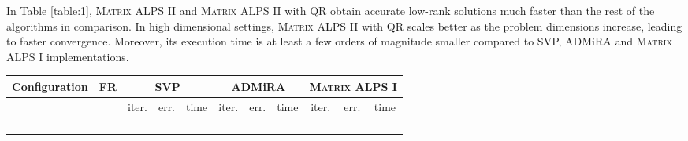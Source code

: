 \documentclass[twocolumn]{svjour3}
\begin{document}
In Table \ref{table:1}, \textsc{Matrix ALPS II} and \textsc{Matrix ALPS II} with QR obtain accurate low-rank solutions much faster than the rest of the algorithms in comparison. In high dimensional settings, \textsc{Matrix ALPS II} with QR scales better as the problem dimensions increase, leading to faster convergence. Moreover, its execution time is at least a few orders of magnitude smaller compared to SVP, ADMiRA and \textsc{Matrix ALPS I} implementations.

\begin{table*}
\caption{General ARM using Noiselets.} {\label{table:1}}
\begin{center}
\begin{tabular}{|c|c|c|c|c|c|c|c|c|c|c|c|c|c}
\multicolumn{4}{c|}{Configuration} & FR & \multicolumn{3}{|c|}{SVP} & \multicolumn{3}{|c|}{ADMiRA} & \multicolumn{3}{|c}{\textsc{Matrix ALPS I}} \\
\hline \hline
\multicolumn{1}{c}{}  & \multicolumn{1}{c}{} & \multicolumn{1}{c}{} & \multicolumn{1}{c|}{} & & 
\multicolumn{1}{|c}{\rm{iter.}} & \multicolumn{1}{c}{\rm{err.}} & \multicolumn{1}{c|}{\rm{time}} &
\multicolumn{1}{|c}{\rm{iter.}} & \multicolumn{1}{c}{\rm{err.}} & \multicolumn{1}{c|}{\rm{time}} &
\multicolumn{1}{|c}{\rm{iter.}} & \multicolumn{1}{c}{\rm{err.}} & \multicolumn{1}{c}{\rm{time}} \\
\hline\hline
\multicolumn{1}{c}{} & \multicolumn{1}{c}{} & \multicolumn{1}{c}{} & \multicolumn{1}{c|}{} &  & 
\multicolumn{1}{|c}{} & \multicolumn{1}{c}{} & \multicolumn{1}{c|}{} &
\multicolumn{1}{|c}{} & \multicolumn{1}{c}{} & \multicolumn{1}{c|}{} &
\multicolumn{1}{|c}{} & \multicolumn{1}{c}{} & \multicolumn{1}{c}{} \\
\hline
\multicolumn{1}{c}{} & \multicolumn{1}{c}{} & \multicolumn{1}{c}{} & \multicolumn{1}{c|}{} &  & 
\multicolumn{1}{|c}{} & \multicolumn{1}{c}{} & \multicolumn{1}{c|}{} &
\multicolumn{1}{|c}{} & \multicolumn{1}{c}{} & \multicolumn{1}{c|}{} &
\multicolumn{1}{|c}{} & \multicolumn{1}{c}{} & \multicolumn{1}{c}{} \\
\hline
\multicolumn{1}{c}{} & \multicolumn{1}{c}{} & \multicolumn{1}{c}{} & \multicolumn{1}{c|}{} &  & 
\multicolumn{1}{|c}{} & \multicolumn{1}{c}{} & \multicolumn{1}{c|}{} &
\multicolumn{1}{|c}{} & \multicolumn{1}{c}{} & \multicolumn{1}{c|}{} &
\multicolumn{1}{|c}{} & \multicolumn{1}{c}{} & \multicolumn{1}{c}{} \\
\hline
\multicolumn{1}{c}{} & \multicolumn{1}{c}{} & \multicolumn{1}{c}{} & \multicolumn{1}{c|}{} &  & 
\multicolumn{1}{|c}{} & \multicolumn{1}{c}{} & \multicolumn{1}{c|}{} &

\end{tabular}
\end{center}
\end{table*}
\end{document}
